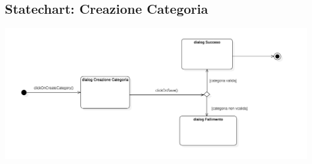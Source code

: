 \raggedright{\subsection{Statechart: Creazione Categoria}}

        \begin{center}
            \includegraphics[width=.95\textwidth]{Immagini/Alexandria/Statechart Creazione Categoria.PNG} 
        \end{center}










